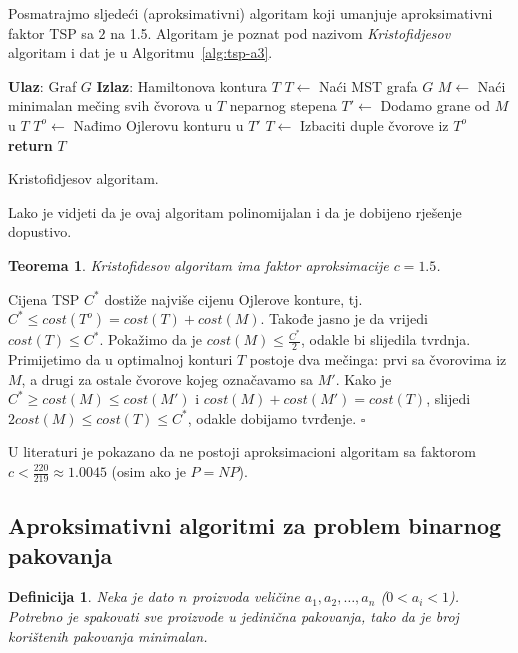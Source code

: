 \documentclass[a4paper, utf8, 11pt, colorlinks]{book}
\newtheorem{definition}{Definicija}
\newtheorem{thm}{Teorema}
\newenvironment{proof}{{Dokaz:}}{\hfill$\square$}
\begin{document}
Posmatrajmo sljedeći (aproksimativni) algoritam koji umanjuje aproksimativni faktor TSP sa $2$ na 1.5. Algoritam je poznat pod nazivom \emph{Kristofidjesov} algoritam i dat je u Algoritmu~\ref{alg:tsp-a3}.

\begin{algorithm}[H] 

	\begin{algorithmic}[1]
		\STATE \textbf{Ulaz}: Graf $G$
		\STATE \textbf{Izlaz}: Hamiltonova kontura $T$ 
		\STATE $T \gets$ Naći MST grafa $G$
		\STATE $M \gets$ Naći minimalan mečing svih čvorova u $T$ neparnog stepena
		\STATE $T' \gets$ Dodamo grane od $M$ u $T$
		\STATE $T^o\gets$ Nađimo Ojlerovu konturu u $T'$
		\STATE $T \gets$ Izbaciti duple čvorove iz $T^o$
		\STATE \textbf{return} $T$
	\end{algorithmic}	
    \caption{Kristofidjesov algoritam.}
    \label{alg:tsp-a3}
\end{algorithm}
  Lako je vidjeti da je ovaj algoritam polinomijalan i da je dobijeno rješenje dopustivo.
  \begin{thm}
  	  Kristofidesov algoritam ima faktor aproksimacije $c=1.5$.
  \end{thm}
\begin{proof}
  Cijena TSP $C^*$ dostiže najviše cijenu Ojlerove konture, tj.  $C^*\leq cost(T^o) = cost(T) + cost(M)$.  Takođe jasno je da vrijedi $cost(T) \leq C^*$. Pokažimo da je $cost(M) \leq  \frac{C^*}{2}$, odakle bi slijedila tvrdnja. Primijetimo da u optimalnoj konturi $T$ postoje dva mečinga: prvi sa čvorovima iz $M$, a drugi za ostale čvorove kojeg označavamo sa $M'$. 
  Kako je $C^* \geq cost(M) \leq cost(M')$ i $cost(M) + cost(M') = cost(T)$, slijedi 
  $2 cost(M) \leq cost(T) \leq C^*$, odakle dobijamo tvrđenje.  
\end{proof} 

U literaturi je pokazano da ne postoji  aproksimacioni algoritam sa faktorom  $c < \frac{220}{219} \approx 1.0045$ (osim ako je $P=NP$). 
 
 
 \subsection{Aproksimativni algoritmi za problem binarnog pakovanja}
\begin{definition}
    Neka je dato $n$ proizvoda veličine $a_1,a_2,\ldots,a_n$ ($0<a_i<1$). Potrebno je spakovati sve proizvode u jedinična pakovanja, tako da je broj korištenih pakovanja minimalan.  
\end{definition} 
\end{document}
